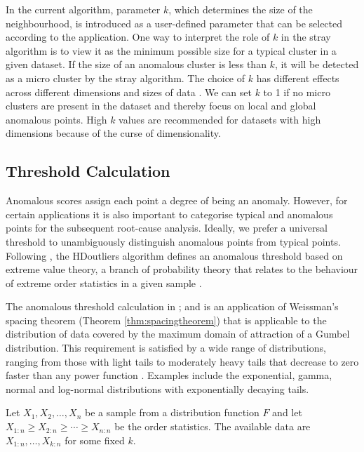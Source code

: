 \documentclass[11pt,a4paper,]{article}
\theoremstyle{definition}
\theoremstyle{definition}
\theoremstyle{definition}
\theoremstyle{remark}
\begin{document}
In the current algorithm, parameter \(k\), which determines the size of the neighbourhood, is introduced as a user-defined parameter that can be selected according to the application. One way to interpret the role of \(k\) in the stray algorithm is to view it as the minimum possible size for a typical cluster in a given dataset. If the size of an anomalous cluster is less than \(k\), it will be detected as a micro cluster by the stray algorithm. The choice of \(k\) has different effects across different dimensions and sizes of data \autocite{campos2016evaluation}. We can set \(k\) to 1 if no micro clusters are present in the dataset and thereby focus on local and global anomalous points. High \(k\) values are recommended for datasets with high dimensions because of the curse of dimensionality.

\hypertarget{threshold-calculation}{%
\subsection{Threshold Calculation}\label{threshold-calculation}}

Anomalous scores assign each point a degree of being an anomaly. However, for certain applications it is also important to categorise typical and anomalous points for the subsequent root-cause analysis. Ideally, we prefer a universal threshold to unambiguously distinguish anomalous points from typical points. Following \textcite{schwarz2008wind}, the HDoutliers algorithm \autocite{wilkinson2017visualizing} defines an anomalous threshold based on extreme value theory, a branch of probability theory that relates to the behaviour of extreme order statistics in a given sample \autocite{galambos2013extreme}.

The anomalous threshold calculation in \textcite{schwarz2008wind}; \textcite{burridge2006additive} and \textcite{wilkinson2017visualizing} is an application of Weissman's spacing theorem \autocite{weissman1978estimation} (Theorem \ref{thm:spacingtheorem}) that is applicable to the distribution of data covered by the maximum domain of attraction of a Gumbel distribution. This requirement is satisfied by a wide range of distributions, ranging from those with light tails to moderately heavy tails that decrease to zero faster than any power function \autocite{embrechts2013modelling}. Examples include the exponential, gamma, normal and log-normal distributions with exponentially decaying tails.

Let \(X_{1},X_{2},\dots ,X_{n}\) be a sample from a distribution function \(F\) and let \(X_{1:n}\geqslant X_{2:n}\geqslant\cdots\geqslant X_{n:n}\) be the order statistics. The available data are \(X_{1:n},\dots,X_{k:n}\) for some fixed \(k.\)
\end{document}
